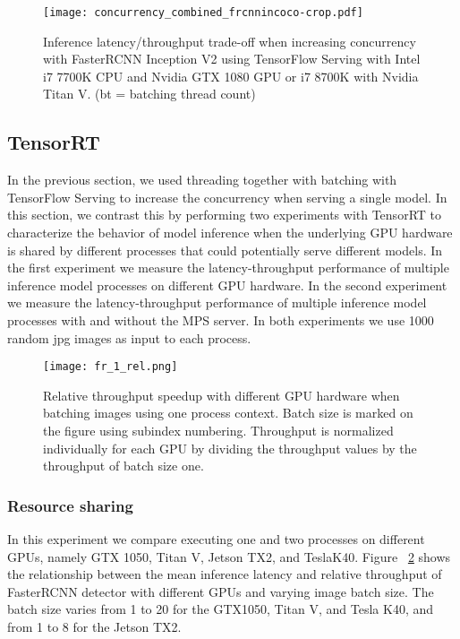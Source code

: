 \documentclass[sigconf]{acmart}
\begin{document}
\begin{figure}[t]
\centering
\texttt{[image: concurrency\_combined\_frcnnincoco-crop.pdf]}
\caption{Inference latency/throughput trade-off when increasing concurrency with FasterRCNN Inception V2 using TensorFlow Serving with Intel i7 7700K CPU and Nvidia GTX 1080 GPU or i7 8700K with Nvidia Titan V. (bt = batching thread count)}
\label{fig:concurrency_latency_frcnninc}
\end{figure}\subsection{TensorRT}In the previous section, we used threading together with batching with TensorFlow Serving to increase the concurrency when serving a single model. In this section, we contrast this by performing two experiments with TensorRT to characterize the behavior of model inference when the underlying GPU hardware is shared by different processes that could potentially serve different models. In the first experiment we measure the latency-throughput performance of multiple inference model processes on different GPU hardware. In the second experiment we measure the latency-throughput performance of multiple inference model processes with and without the MPS server. In both experiments we use 1000 random jpg images as input to each process.

\begin{figure}[t]
\centering
\texttt{[image: fr\_1\_rel.png]}
\caption{Relative throughput speedup with different GPU hardware when batching images using one process context. Batch size is marked on the figure using subindex numbering. Throughput is normalized individually for each GPU by dividing the throughput values by the throughput of batch size one.}
\label{fig:fr_1_rel}
\end{figure}\subsubsection{Resource sharing}

In this experiment we compare executing one and two processes on different GPUs, namely GTX 1050, Titan V, Jetson TX2, and TeslaK40. Figure ~\ref{fig:fr_1_rel} shows the relationship between the mean inference latency and relative throughput of FasterRCNN detector with different GPUs and varying image batch size. The batch size varies from 1 to 20 for the GTX1050, Titan V, and Tesla K40, and from 1 to 8 for the Jetson TX2.
\end{document}
